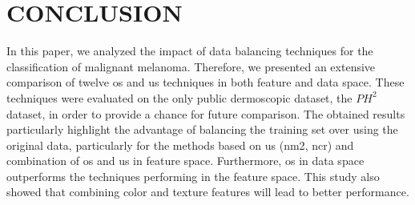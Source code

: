 \graphicspath{ {./content/Experiments-results/figures/} }

\section{\uppercase{Conclusion}}
\label{sec:cons} 

\noindent In this paper, we analyzed the impact of data balancing techniques for the classification of malignant melanoma.
Therefore, we presented an extensive comparison of twelve \ac{os} and \ac{us} techniques in both feature and data space.
These techniques were evaluated on the only public dermoscopic dataset, the $PH^{2}$ dataset, in order to provide a chance for future comparison.
The obtained results particularly highlight the advantage of balancing the training set over using the original data, particularly for the methods based on \ac{us} (\ac{nm2}, \ac{ncr}) and combination of \ac{os} and \ac{us} in feature space.
Furthermore, \ac{os} in data space outperforms the techniques performing in the feature space.
This study also showed that combining color and texture features will lead to better performance. 




